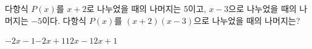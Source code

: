 다항식 $P(x)$를 $x+2$로 나누었을 때의 나머지는 5이고, $x-3$으로 나누었을 때의 나머지는 $-5$이다. 다항식 $P(x)$를 $(x+2)(x-3)$으로 나누었을 때의 나머지는?
\begin{choices32}{$-2x-1$}{$-2x+1$}{$1$}{$2x-1$}{$2x+1$}\end{choices32}
